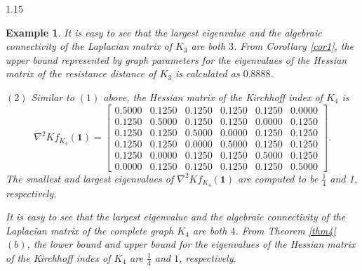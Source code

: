 \documentclass[preprint,12pt]{elsarticle1}
\newtheorem{rmk}[thm]{Remark}
\newtheorem{example}[thm]{Example}
\numberwithin{equation}{section}
\begin{document}
\begin{spacing}{1.15}
\begin{example}
It is easy to see that the largest eigenvalue and the algebraic connectivity of the Laplacian matrix of $K_{3}$ are both $3$. From Corollary \ref{cor1}, the upper bound represented by graph parameters for the eigenvalues of the Hessian matrix of the resistance distance of $K_3$ is calculated as  $0.8888$.



$(2)$ Similar to $(1)$ above, the Hessian matrix of the Kirchhoff index of $K_{4}$ is
$$ \nabla^{2}Kf_{K_{4}}(\textbf{1})=\left[\begin{array}{cccccc}
    0.5000 &   0.1250  &  0.1250  &  0.1250 &   0.1250 &   0.0000\\
    0.1250  &  0.5000  &  0.1250 &   0.1250  &  0.0000 &   0.1250\\
    0.1250  &  0.1250 &   0.5000   & 0.0000 &   0.1250  &  0.1250\\
    0.1250  &  0.1250   & 0.0000  &  0.5000 &   0.1250 &   0.1250\\
    0.1250  &  0.0000  &  0.1250  &  0.1250 &   0.5000 &   0.1250\\
    0.0000  &  0.1250   & 0.1250  &  0.1250 &   0.1250 & 0.5000\end{array}
\right].$$
The smallest and largest eigenvalues of $\nabla^{2}Kf_{K_4}(\mathbf{1})$ are computed to be $\frac{1}{4}$ and 1, respectively.


It is easy to see that the largest eigenvalue and the algebraic connectivity of the Laplacian matrix of the complete graph $K_{4}$ are both $4$. From Theorem \ref{thm4} $(b)$, the lower bound and upper bound for the eigenvalues of the Hessian matrix of the Kirchhoff index of $K_{4}$ are $\frac{1}{4}$ and $1$, respectively.


\end{example}



\end{spacing}
\end{document}

